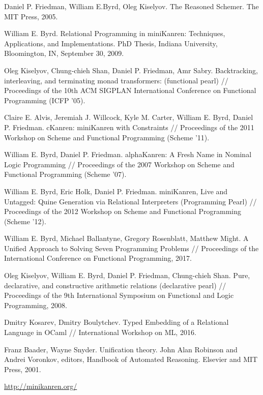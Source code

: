     \begin{thebibliography}{99}

      Daniel P. Friedman, William E.Byrd, Oleg Kiselyov. The Reasoned Schemer. The MIT
      Press, 2005.

      William E. Byrd. Relational Programming in miniKanren: Techniques, Applications, and Implementations. PhD Thesis,
      Indiana University, Bloomington, IN, September 30, 2009.
      
      Oleg Kiselyov, Chung-chieh Shan, Daniel P. Friedman, Amr Sabry.
      Backtracking, interleaving, and terminating monad transformers: (functional pearl) //
      Proceedings of the 10th ACM SIGPLAN International Conference on Functional Programming (ICFP '05).

      Claire E. Alvis, Jeremiah J. Willcock, Kyle M. Carter, William E. Byrd, Daniel P. Friedman.
      cKanren: miniKanren with Constraints //
      Proceedings of the 2011 Workshop on Scheme and Functional Programming (Scheme '11).
      
      William E. Byrd, Daniel P. Friedman. alphaKanren: A Fresh Name in Nominal Logic Programming //
      Proceedings of the 2007 Workshop on Scheme and Functional Programming (Scheme '07).

      William E. Byrd, Eric Holk, Daniel P. Friedman.
      miniKanren, Live and Untagged: Quine Generation via Relational Interpreters (Programming Pearl) //
      Proceedings of the 2012 Workshop on Scheme and Functional Programming (Scheme '12).
      
      William E. Byrd, Michael Ballantyne, Gregory Rosenblatt, Matthew Might. A Unified Approach to Solving Seven Programming Problems // 
      Proceedings of the International Conference on Functional Programming, 2017.
      
      Oleg Kiselyov, William E. Byrd, Daniel P. Friedman, Chung-chieh Shan.
      Pure, declarative, and constructive arithmetic relations (declarative pearl) //
      Proceedings of the 9th International Symposium on Functional and Logic Programming, 2008.
      
      Dmitry Kosarev, Dmitry Boulytchev. Typed Embedding of a Relational Language in OCaml // International Workshop on ML, 2016.
      
     Franz Baader, Wayne Snyder.
     Unification theory.
     John Alan Robinson and Andrei Voronkov, editors,
     Handbook of Automated Reasoning. Elsevier and MIT Press, 2001.
      
      \url{http://minikanren.org/}

    \end{thebibliography}
